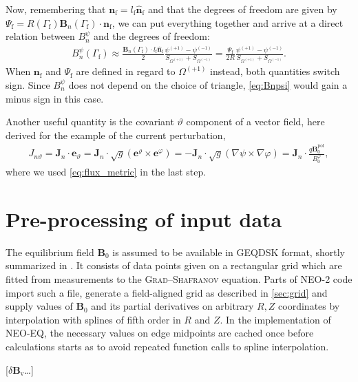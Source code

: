 \documentclass[a4paper, twoside, 10pt, english]{article}
\numberwithin{equation}{section}
\let\temp\varrho
\let\varrho\rho
\let\rho\temp
\let\temp\vartheta
\let\vartheta\theta
\let\theta\temp
\let\temp\varphi
\let\varphi\phi
\let\phi\temp
\let\vec\symbf
\newcommand*\grad{\ensuremath{\nabla}}
\newcommand*\pol{\ensuremath{\textrm{pol}}}  %
\newcommand*\Bvac{\ensuremath{\delta \vec{B}_{\text{v}}}}  %
\newcommand*\fs{\ensuremath{\textrm{f}}}  %
\begin{document}
Now, remembering that $\vec{n}_{\fs} = l_{\fs} \hat{\vec{n}}_{\fs}$ and that the degrees of freedom are given by $\Psi_{\fs} = R (\Gamma_{\fs}) \vec{B}_{n} (\Gamma_{\fs}) \cdot \vec{n}_{\fs}$, we can put everything together and arrive at a direct relation between $B_{n}^{\psi}$ and the degrees of freedom:
\begin{gather}
  B_{n}^{\psi} (\Gamma_{\fs}) \approx \frac{\vec{B}_{n} (\Gamma_{\fs}) \cdot l_{\fs} \hat{\vec{n}}_{\fs}}{2} \frac{\psi^{(+1)} - \psi^{(-1)}}{S_{\Omega^{(+1)}} + S_{\Omega^{(-1)}}} = \frac{\Psi_{\fs}}{2 R} \frac{\psi^{(+1)} - \psi^{(-1)}}{S_{\Omega^{(+1)}} + S_{\Omega^{(-1)}}}. \label{eq:Bnpsi}
\end{gather}
When $\vec{n}_{\fs}$ and $\Psi_{\fs}$ are defined in regard to $\Omega^{(+1)}$ instead, both quantities switch sign. Since $B_{n}^{\psi}$ does not depend on the choice of triangle, \cref{eq:Bnpsi} would gain a minus sign in this case.

Another useful quantity is the covariant $\theta$ component of a vector field, here derived for the example of the current perturbation,
\begin{gather}
  J_{n \theta} = \vec{J}_{n} \cdot \vec{e}_{\theta} = \vec{J}_{n} \cdot \sqrt{g} \left ( \vec{e}^{\rho} \times \vec{e}^{\phi} \right ) = -\vec{J}_{n} \cdot \sqrt{g} (\grad \psi \times \grad \phi) = \vec{J}_{n} \cdot \frac{q \vec{B}_{0}^{\pol}}{B_{0}^{\phi}},
\end{gather}
where we used \cref{eq:flux_metric} in the last step.

\clearpage
\section{Pre-processing of input data}
\label{sec:inputs}

The equilibrium field $\vec{B}_{0}$ is assumed to be available in GEQDSK format, shortly summarized in \cite{Lao97}. It consists of data points given on a rectangular grid which are fitted from measurements to the \textsc{Grad}--\textsc{Shafranov} equation. Parts of NEO-2 code import such a file, generate a field-aligned grid as described in \cref{sec:grid} and supply values of $\vec{B}_{0}$ and its partial derivatives on arbitrary $R, Z$ coordinates by interpolation with splines of fifth order in $R$ and $Z$. In the implementation of NEO-EQ, the necessary values on edge midpoints are cached once before calculations starts as to avoid repeated function calls to spline interpolation.

[\Bvac \ldots]
\end{document}
